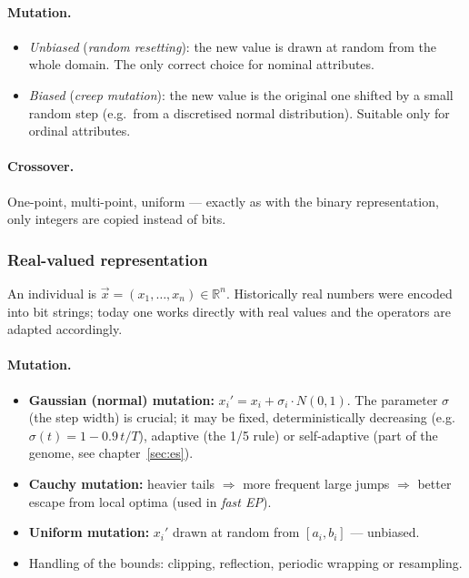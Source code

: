 \documentclass[11pt,a4paper]{article}
\theoremstyle{definition}
\begin{document}
\paragraph{Mutation.}
\begin{itemize}
\item \emph{Unbiased} (\emph{random resetting}): the new value is drawn at
  random from the whole domain. The only correct choice for nominal attributes.
\item \emph{Biased} (\emph{creep mutation}): the new value is the original one
  shifted by a small random step (e.g.\ from a discretised normal
  distribution). Suitable only for ordinal attributes.
\end{itemize}

\paragraph{Crossover.} One-point, multi-point, uniform --- exactly as with the
binary representation, only integers are copied instead of bits.

\subsubsection{Real-valued representation}

An individual is $\vec{x} = (x_1,\dots,x_n) \in \mathbb{R}^n$. Historically real
numbers were encoded into bit strings; today one works directly with real values
and the operators are adapted accordingly.

\paragraph{Mutation.}
\begin{itemize}
\item \textbf{Gaussian (normal) mutation:}
  $x_i' = x_i + \sigma_i \cdot N(0,1)$. The parameter $\sigma$ (the step width)
  is crucial; it may be fixed, deterministically decreasing
  (e.g.\ $\sigma(t) = 1 - 0.9\,t/T$), adaptive (the 1/5 rule) or self-adaptive
  (part of the genome, see chapter~\ref{sec:es}).
\item \textbf{Cauchy mutation:} heavier tails $\Rightarrow$ more frequent large
  jumps $\Rightarrow$ better escape from local optima (used in \emph{fast EP}).
\item \textbf{Uniform mutation:} $x_i'$ drawn at random from $[a_i, b_i]$ ---
  unbiased.
\item Handling of the bounds: clipping, reflection, periodic wrapping or
  resampling.
\end{itemize}
\end{document}
